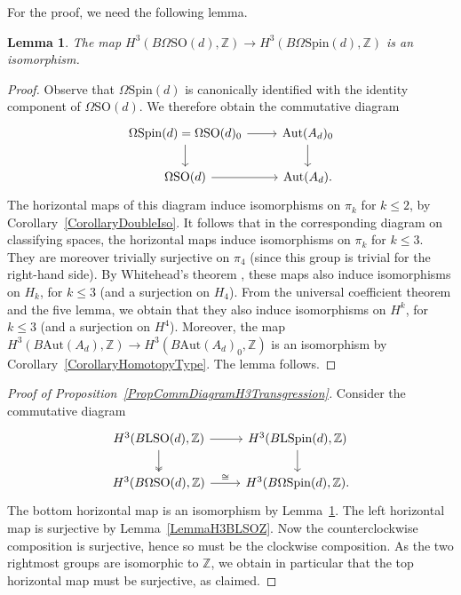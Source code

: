 \documentclass[pdftex]{sigma}
\numberwithin{equation}{section}
\newtheorem{Lemma}[Theorem]{Lemma}
\newcommand{\Z}{\mathbb{Z}}
\newcommand{\SO}{\mathrm{SO}}
\newcommand{\Aut}{\mathrm{Aut}}
\newcommand{\Spin}{\mathrm{Spin}}
\renewcommand{\L}{\mathrm{L}}
\begin{document}
For the proof, we need the following lemma.

\begin{Lemma} \label{LemmaH3IsoSoSpin}
The map $H^3(B\Omega\SO(d), \Z) \to H^3(B\Omega\Spin(d), \Z)$ is an isomorphism.
\end{Lemma}

\begin{proof}
Observe that $\Omega\Spin(d)$ is canonically identified with the identity component of $\Omega\SO(d)$.
We therefore obtain the commutative diagram
\begin{equation*}
\begin{tikzcd}
 \Omega \Spin(d) = \Omega \SO(d)_0 \ar[r] \ar[d] & \Aut(A_d)_0 \ar[d] \\
 \Omega \SO(d) \ar[r] & \Aut(A_d).
\end{tikzcd}
\end{equation*}
The horizontal maps of this diagram induce isomorphisms on $\pi_k$ for $k\leq 2$, by Corollary~\ref{CorollaryDoubleIso}.
It follows that in the corresponding diagram on classifying spaces, the horizontal maps induce isomorphisms on $\pi_k$ for $k \leq 3$.
They are moreover trivially surjective on $\pi_4$ (since this group is trivial for the right-hand side).
By Whitehead's theorem \cite[Theorem~10.28]{Switzer}, these maps also induce isomorphisms on $H_k$, for $k \leq 3$ (and a surjection on $H_4$).
From the universal coefficient theorem and the five lemma, we obtain that they also induce isomorphisms on $H^k$, for $k \leq 3$ (and a surjection on $H^4$).
Moreover, the map $H^3(B\Aut(A_d), \Z) \to H^3(B\Aut(A_d)_0, \Z)$ is an isomorphism by Corollary~\ref{CorollaryHomotopyType}.
The lemma follows.
\end{proof}

\begin{proof}[Proof of Proposition~\ref{PropCommDiagramH3Transgression}]
Consider the commutative diagram
\begin{equation*}
\begin{tikzcd}
 H^3(B\L\SO(d), \Z) \ar[d, two heads] \ar[r] & H^{3}(B\L\Spin(d), \Z) \ar[d]\\
 H^3(B\Omega\SO(d), \Z) \ar[r, "\cong"] & H^3(B\Omega\Spin(d), \Z).
 \end{tikzcd}
\end{equation*}
The bottom horizontal map is an isomorphism by Lemma~\ref{LemmaH3IsoSoSpin}.
The left horizontal map is surjective by Lemma~\ref{LemmaH3BLSOZ}.
Now the counterclockwise composition is surjective, hence so must be the clockwise composition.
As the two rightmost groups are isomorphic to $\Z$, we obtain in particular that the top horizontal map must be surjective, as claimed.
\end{proof}
\end{document}
